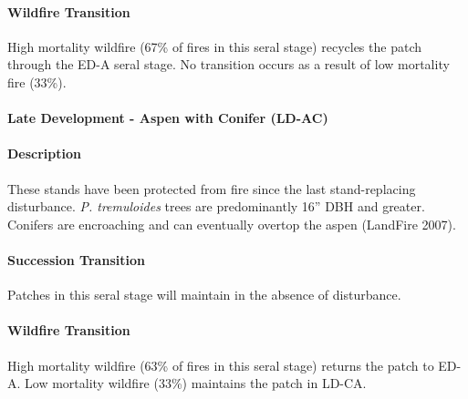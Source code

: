 \paragraph{Wildfire Transition} High mortality wildfire (67\% of fires in this seral stage) recycles the patch through the ED-A seral stage. No transition occurs as a result of low mortality fire (33\%).

\noindent\hrulefill



\paragraph{Late Development - Aspen with Conifer (LD-AC)}

\paragraph{Description} These stands have been protected from fire since the last stand-replacing disturbance. \emph{P. tremuloides} trees are predominantly 16'' DBH and greater. Conifers are encroaching and can eventually overtop the aspen (LandFire 2007).

\paragraph{Succession Transition} Patches in this seral stage will maintain in the absence of disturbance.

\paragraph{Wildfire Transition} High mortality wildfire (63\% of fires in this seral stage) returns the patch to ED-A. Low mortality wildfire (33\%) maintains the patch in LD-CA.

\noindent\hrulefill




